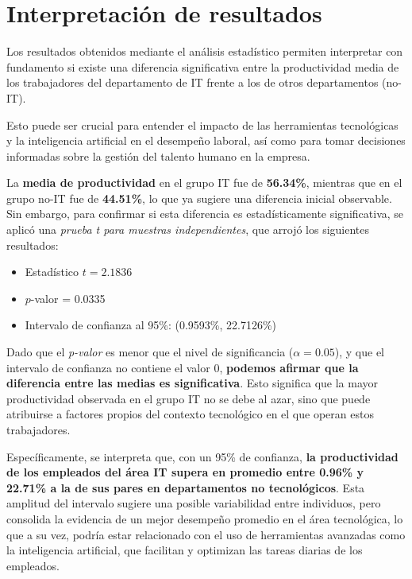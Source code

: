 \section{Interpretación de resultados}

Los resultados obtenidos mediante el análisis estadístico permiten interpretar con fundamento si existe una diferencia significativa entre la productividad media de los trabajadores del departamento de IT frente a los de otros departamentos (no-IT).

Esto puede ser crucial para entender el impacto de las herramientas tecnológicas y la inteligencia artificial en el desempeño laboral, así como para tomar decisiones informadas sobre la gestión del talento humano en la empresa.

La \textbf{media de productividad} en el grupo IT fue de \textbf{56.34\%}, mientras que en el grupo no-IT fue de \textbf{44.51\%}, lo que ya sugiere una diferencia inicial observable. Sin embargo, para confirmar si esta diferencia es estadísticamente significativa, se aplicó una \textit{prueba t para muestras independientes}, que arrojó los siguientes resultados:

\begin{itemize}
    \item Estadístico $t = 2.1836$
    \item $p$-valor = 0.0335
    \item Intervalo de confianza al 95\%: (0.9593\%, 22.7126\%)
\end{itemize}

Dado que el \textit{p-valor} es menor que el nivel de significancia ($\alpha = 0.05$), y que el intervalo de confianza no contiene el valor 0, \textbf{podemos afirmar que la diferencia entre las medias es significativa}. Esto significa que la mayor productividad observada en el grupo IT no se debe al azar, sino que puede atribuirse a factores propios del contexto tecnológico en el que operan estos trabajadores.

Específicamente, se interpreta que, con un 95\% de confianza, \textbf{la productividad de los empleados del área IT supera en promedio entre 0.96\% y 22.71\% a la de sus pares en departamentos no tecnológicos}. Esta amplitud del intervalo sugiere una posible variabilidad entre individuos, pero consolida la evidencia de un mejor desempeño promedio en el área tecnológica, lo que a su vez, podría estar relacionado con el uso de herramientas avanzadas como la inteligencia artificial, que facilitan y optimizan las tareas diarias de los empleados.

